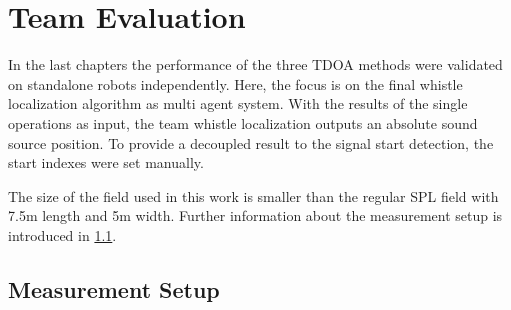\newpage
\section{Team Evaluation}
\label{sec:04_teamEvaluation}

In the last chapters the performance of the three \ac{TDOA} methods
were validated on standalone robots independently.
Here, the focus is on the final whistle localization algorithm
as multi agent system.
With the results of the single operations as input,
the team whistle localization outputs an absolute sound source position.
To provide a decoupled result to the signal start detection,
the start indexes were set manually.

The size of the field used in this work is smaller than the regular \ac{SPL}
field with 7.5\si{m} length and 5\si{m} width.
Further information about the measurement setup is introduced in \cref{subsec:04_labMeasurements}.

\subsection{Measurement Setup}
\label{subsec:04_labMeasurements}

